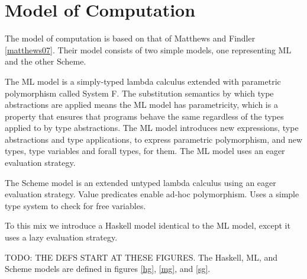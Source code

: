 \newcommand{\haskell}{Haskell model\xspace}
\newcommand{\ml}{ML model\xspace}
\newcommand{\scheme}{Scheme model\xspace}

\newcommand{\haskellml}{Haskell and ML models\xspace}

\newcommand{\articalhaskell}[1]{#1 \haskell}
\newcommand{\articalml}[1]{#1 \ml}
\newcommand{\articalscheme}[1]{#1 \scheme}

\newcommand{\articalhaskellml}[1]{#1 \haskellml}

\newcommand{\thehaskell}{\articalhaskell{the}}
\newcommand{\Thehaskell}{\articalhaskell{The}}
\newcommand{\theml}{\articalml{the}}
\newcommand{\Theml}{\articalml{The}}
\newcommand{\thescheme}{\articalscheme{the}}
\newcommand{\Thescheme}{\articalscheme{The}}

\newcommand{\thehaskellml}{\articalhaskellml{the}}
\newcommand{\Thehaskellml}{\articalhaskellml{The}}

\newcommand{\hastype}[1]{has the type #1}
\newcommand{\havetype}[1]{have the type #1}

\chapter{Model of Computation}

The model of computation is based on that of Matthews and Findler \ref{matthews07}. Their model consists of two simple models, one representing ML and the other Scheme.

The ML model is a simply-typed lambda calculus extended with parametric polymorphism called System F. The substitution semantics by which type abstractions are applied means the ML model has parametricity, which is a property that ensures that programs behave the same regardless of the types applied to by type abstractions.  The ML model introduces new expressions, type abstractions and type applications, to express parametric polymorphism, and new types, type variables and forall types, for them. The ML model uses an eager evaluation strategy.

The Scheme model is an extended untyped lambda calculus using an eager evaluation strategy. Value predicates enable ad-hoc polymorphism. Uses a simple type system to check for free variables.

To this mix we introduce a Haskell model identical to the ML model, except it uses a lazy evaluation strategy.

TODO: THE DEFS START AT THESE FIGURES. The Haskell, ML, and Scheme models are defined in figures \ref{hg}, \ref{mg}, and \ref{sg}.

